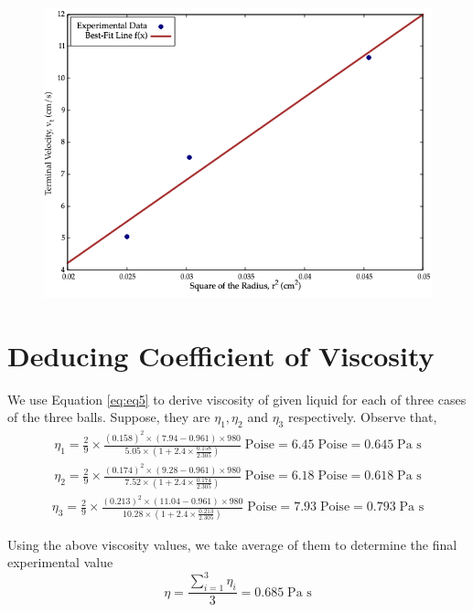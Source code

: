 \documentclass[11pt, a4paper, abstract=true]{scrartcl}
\begin{document}
\begin{figure}[H]
    \centering
    \includegraphics[scale=0.60]{plot.png}
\end{figure}

\section{Deducing Coefficient of Viscosity}
We use Equation \ref{eq:eq5} to derive viscosity of given liquid for each of three cases of the three balls. Suppose, they are \(\eta_1, \eta_2\) and \(\eta_3\) respectively. Observe that,
\begin{align*}
    \eta_1 = \frac{2}{9} \times \frac{(0.158)^2 \times(7.94 - 0.961) \times 980}{5.05 \times (1 + 2.4 \times \frac{0.158}{2.305})} \; \text{Poise} = 6.45 \; \text{Poise} = 0.645 \; \text{Pa s}
\end{align*}
\begin{align*}
    \eta_2 = \frac{2}{9} \times \frac{(0.174)^2 \times(9.28 - 0.961) \times 980}{7.52 \times (1 + 2.4 \times \frac{0.174}{2.305})} \; \text{Poise} = 6.18 \; \text{Poise} = 0.618 \; \text{Pa s}
\end{align*}
\begin{align*}
    \eta_3 = \frac{2}{9} \times \frac{(0.213)^2 \times(11.04 - 0.961) \times 980}{10.28 \times (1 + 2.4 \times \frac{0.213}{2.305})} \; \text{Poise} = 7.93 \; \text{Poise} = 0.793 \; \text{Pa s}
\end{align*}

Using the above viscosity values, we take average of them to determine the final experimental value \[\boxed{\eta = \frac{\sum_{i=1}^3 \eta_i}{3} = 0.685 \; \text{Pa s}}\]
 
\end{document}
